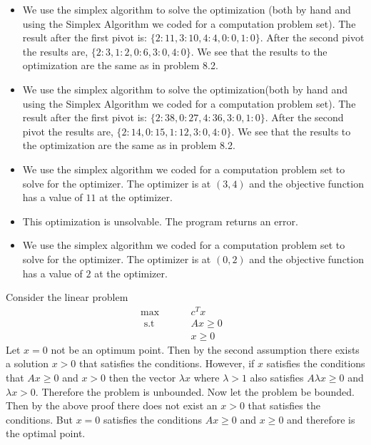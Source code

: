 \documentclass[12pt]{article}
\newenvironment{problem}[2][Problem]{\begin{trivlist}
\item[\hskip \labelsep {\bfseries #1}\hskip \labelsep {\bfseries #2}]}{\end{trivlist}}
\begin{document}
\begin{problem}{8.5.}\hfill
\begin{itemize}
\item[(i)] We use the simplex algorithm to solve the optimization (both by hand and using the Simplex Algorithm we coded for a computation problem set). The result after the first pivot is: $\{2:11 , 3:10, 4:4,0:0, 1:0\}$. After the second pivot the results are, $\{2:3 ,1:2, 0:6, 3:0, 4:0\}$. We see that the results to the optimization are the same as in problem 8.2. 
\item[(ii) ]We use the simplex algorithm to solve the optimization(both by hand and using the Simplex Algorithm we coded for a computation problem set). The result after the first pivot is: $\{2:38, 0:27, 4:36, 3:0, 1:0\}$. After the second pivot the results are, $\{2:14 ,0:15, 1:12, 3:0, 4:0\}$. We see that the results to the optimization are the same as in problem 8.2. 
\end{itemize}
\end{problem}

\begin{problem}{8.7.} \hfill
\begin{itemize}
\item[(i)] We use the simplex algorithm we coded for a computation problem set to solve for the optimizer. The optimizer is at $(3, 4)$ and the objective function has a value of $11$ at the optimizer. 
\item[(ii)] This optimization is unsolvable. The program returns an error. 
\item[(iii)] We use the simplex algorithm we coded for a computation problem set to solve for the optimizer. The optimizer is at $(0, 2)$ and the objective function has a value of $2$ at the optimizer. 
\end{itemize}
\end{problem}

\begin{problem}{8.13.} 
Consider the linear problem 
\begin{align*}
\max \hspace{1cm} & c^Tx &\\
 \text{ s.t } \hspace{1cm}  & Ax \geq 0& \\
 & x \geq 0&
\end{align*}
Let $x = 0$ not be an optimum point. Then by the second assumption there exists a solution $x > 0$ that satisfies the conditions. However, if $x$ satisfies the conditions that $Ax \geq 0$ and $x >0$ then the vector $\lambda x$ where $\lambda > 1$ also satisfies $A\lambda x \geq 0 $ and $\lambda x > 0$. Therefore the problem is unbounded. Now let the problem be bounded. Then by the above proof there does not exist an $x > 0$ that satisfies the conditions. But $x = 0$ satisfies the conditions $Ax \geq 0$ and $x \geq 0$ and therefore is the optimal point. 
\end{problem}
\end{document}
